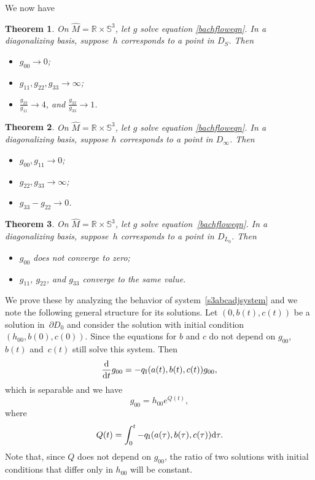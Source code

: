 \documentclass[pdftex]{sigma}
\numberwithin{equation}{section}
\newtheorem{Theorem}{Theorem}[section]
\newcommand{\dtime}{\frac{{\rm d}}{{\rm d} t}} %
\begin{document}
We now have

\begin{Theorem} \label{s3thm1} On $\widehat{M} = \mathbb{R} \times \mathbb{S}^3$, let $g$ solve equation \eqref{bachfloweqn}. In a diagonalizing basis, suppose~$h$ corresponds to a point in $D_S$. Then
\begin{itemize}\itemsep=0pt
\item $g_{00} \rightarrow 0$;
\item $g_{11}, g_{22}, g_{33} \rightarrow \infty$;
\item $\frac{g_{22}}{g_{11}} \rightarrow 4$, and $\frac{g_{22}}{g_{33}} \rightarrow 1$.
\end{itemize}
\end{Theorem}

\begin{Theorem} \label{s3thm2}
On $\widehat{M} = \mathbb{R} \times \mathbb{S}^3$, let $g$ solve equation \eqref{bachfloweqn}. In a diagonalizing basis, suppose $h$ corresponds to a point in $D_{\infty}$. Then
\begin{itemize}\itemsep=0pt
\item $g_{00}, g_{11} \rightarrow 0$;
\item $g_{22}, g_{33} \rightarrow \infty$;
\item $g_{33} - g_{22} \rightarrow 0$.
\end{itemize}
\end{Theorem}

\begin{Theorem} \label{s3thm3}
On $\widehat{M} = \mathbb{R} \times \mathbb{S}^3$, let $g$ solve equation~\eqref{bachfloweqn}. In a diagonalizing basis, suppose~$h$ corresponds to a point in $D_{L_0}$. Then
\begin{itemize}\itemsep=0pt
\item $g_{00}$ does not converge to zero;
\item $g_{11}$, $g_{22}$, and $g_{33}$ converge to the same value.
\end{itemize}
\end{Theorem}

We prove these by analyzing the behavior of system~\eqref{s3abcadjsystem} and we note the following general structure for its solutions. Let $(0, b(t), c(t))$ be a solution in~$\partial D_0$ and consider the solution with initial condition $(h_{00}, b(0), c(0))$. Since the equations for $b$ and $c$ do not depend on $g_{00}$, $b(t)$ and~$c(t)$ still solve this system. Then
\[
\dtime g_{00} = -q_{\rm I}(a(t), b(t), c(t)) g_{00},
\]
which is separable and we have
\[
g_{00} = h_{00} e^{Q(t)},
\]
where
\begin{gather} \label{s3integraleqn}
Q(t) = \int_0^t -q_{\rm I}(a(\tau), b(\tau), c(\tau)) {\rm d}\tau.
\end{gather}
Note that, since $Q$ does not depend on $g_{00}$, the ratio of two solutions with initial conditions that differ only in $h_{00}$ will be constant.
\end{document}
